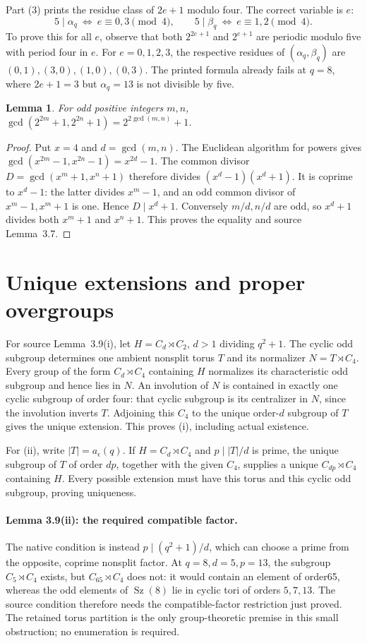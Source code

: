 \documentclass[11pt,a4paper]{article}
\newtheorem{lemma}{Lemma}
\newcommand{\Sz}{\operatorname{Sz}}
\begin{document}
Part (3) prints the residue class of $2e+1$ modulo four. The correct
variable is $e$:
\[
 5\mid\alpha_q\ \Longleftrightarrow\ e\equiv0,3\pmod4,
 \qquad
 5\mid\beta_q\ \Longleftrightarrow\ e\equiv1,2\pmod4.
\]
To prove this for all $e$, observe that both $2^{2e+1}$ and $2^{e+1}$
are periodic modulo five with period four in $e$. For $e=0,1,2,3$,
the respective residues of $(\alpha_q,\beta_q)$ are
$(0,1),(3,0),(1,0),(0,3)$. The printed formula already fails at
$q=8$, where $2e+1=3$ but $\alpha_q=13$ is not divisible by five.

\begin{lemma}
For odd positive integers $m,n$,
$\gcd(2^{2m}+1,2^{2n}+1)=2^{2\gcd(m,n)}+1$.
\end{lemma}
\begin{proof}
Put $x=4$ and $d=\gcd(m,n)$. The Euclidean algorithm for powers
gives $\gcd(x^{2m}-1,x^{2n}-1)=x^{2d}-1$.
The common divisor $D=\gcd(x^m+1,x^n+1)$ therefore divides
$(x^d-1)(x^d+1)$. It is coprime to $x^d-1$: the latter divides
$x^m-1$, and an odd common divisor of $x^m-1,x^m+1$ is one.
Hence $D\mid x^d+1$. Conversely $m/d,n/d$ are odd, so
$x^d+1$ divides both $x^m+1$ and $x^n+1$. This proves the equality
and source Lemma~3.7.
\end{proof}

\section{Unique extensions and proper overgroups}
For source Lemma~3.9(i), let $H=C_d\rtimes C_2$, $d>1$ dividing
$q^2+1$. The cyclic odd subgroup determines one ambient nonsplit torus
$T$ and its normalizer $N=T\rtimes C_4$. Every group of the form
$C_d\rtimes C_4$ containing $H$ normalizes its characteristic odd
subgroup and hence lies in $N$. An involution of $N$ is contained in
exactly one cyclic subgroup of order four: that cyclic subgroup is its
centralizer in $N$, since the involution inverts $T$. Adjoining this
$C_4$ to the unique order-$d$ subgroup of $T$ gives the unique extension.
This proves (i), including actual existence.

For (ii), write $|T|=a_\epsilon(q)$. If $H=C_d\rtimes C_4$ and
$p\mid |T|/d$ is prime, the unique subgroup of $T$ of order $dp$,
together with the given $C_4$, supplies a unique $C_{dp}\rtimes C_4$
containing $H$. Every possible extension must have this torus and
this cyclic odd subgroup, proving uniqueness.

\paragraph{Lemma 3.9(ii): the required compatible factor.}
The native condition is instead $p\mid(q^2+1)/d$, which can choose
a prime from the opposite, coprime nonsplit factor. At $q=8,d=5,p=13$,
the subgroup $C_5\rtimes C_4$ exists, but $C_{65}\rtimes C_4$
does not: it would contain an element of order65, whereas the odd
elements of $\Sz(8)$ lie in cyclic tori of orders $5,7,13$.
The source condition therefore needs the compatible-factor restriction
just proved. The retained torus partition is the only group-theoretic
premise in this small obstruction; no enumeration is required.
\end{document}
